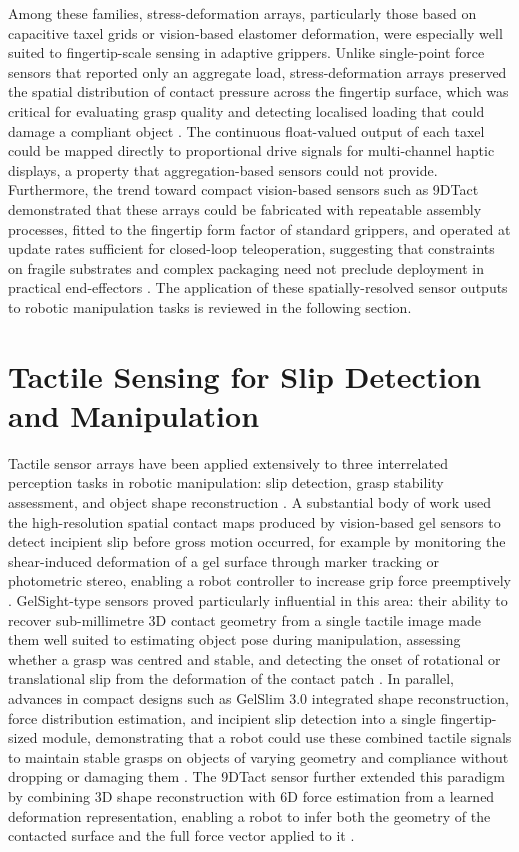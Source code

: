 \documentclass[12pt, a4paper]{report}
\begin{document}
Among these families, stress-deformation arrays, particularly those based on capacitive taxel grids or vision-based elastomer deformation, were especially well suited to fingertip-scale sensing in adaptive grippers. Unlike single-point force sensors that reported only an aggregate load, stress-deformation arrays preserved the spatial distribution of contact pressure across the fingertip surface, which was critical for evaluating grasp quality and detecting localised loading that could damage a compliant object \cite{dahiya2010}. The continuous float-valued output of each taxel could be mapped directly to proportional drive signals for multi-channel haptic displays, a property that aggregation-based sensors could not provide. Furthermore, the trend toward compact vision-based sensors such as 9DTact demonstrated that these arrays could be fabricated with repeatable assembly processes, fitted to the fingertip form factor of standard grippers, and operated at update rates sufficient for closed-loop teleoperation, suggesting that constraints on fragile substrates and complex packaging need not preclude deployment in practical end-effectors \cite{lin2023}. The application of these spatially-resolved sensor outputs to robotic manipulation tasks is reviewed in the following section.

\section{Tactile Sensing for Slip Detection and Manipulation}
Tactile sensor arrays have been applied extensively to three interrelated perception tasks in robotic manipulation: slip detection, grasp stability assessment, and object shape reconstruction \cite{dahiya2010}. A substantial body of work used the high-resolution spatial contact maps produced by vision-based gel sensors to detect incipient slip before gross motion occurred, for example by monitoring the shear-induced deformation of a gel surface through marker tracking or photometric stereo, enabling a robot controller to increase grip force preemptively \cite{donggelsight2021}. %
GelSight-type sensors proved particularly influential in this area: their ability to recover sub-millimetre 3D contact geometry from a single tactile image made them well suited to estimating object pose during manipulation, assessing whether a grasp was centred and stable, and detecting the onset of rotational or translational slip from the deformation of the contact patch \cite{donggelsight2021}. In parallel, advances in compact designs such as GelSlim 3.0 integrated shape reconstruction, force distribution estimation, and incipient slip detection into a single fingertip-sized module, demonstrating that a robot could use these combined tactile signals to maintain stable grasps on objects of varying geometry and compliance without dropping or damaging them \cite{taylor2021}. The 9DTact sensor further extended this paradigm by combining 3D shape reconstruction with 6D force estimation from a learned deformation representation, enabling a robot to infer both the geometry of the contacted surface and the full force vector applied to it \cite{lin2023}.
\end{document}
